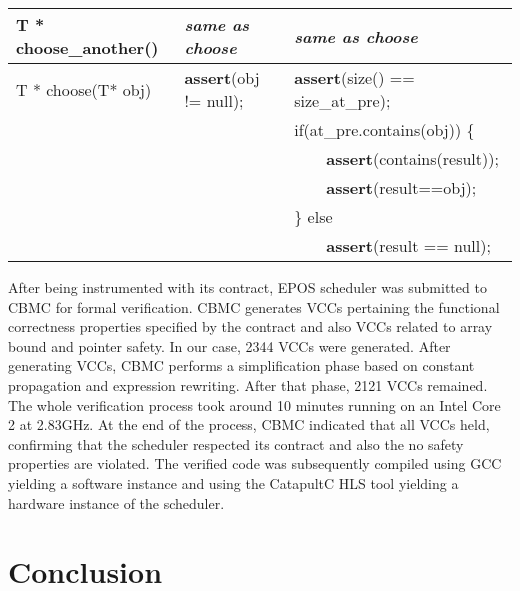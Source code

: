 \documentclass{sig-alternate}
\begin{document}
\begin{table*}[htb]
\begin{center}
{\begin{tabular}{|p{}|p{}|p{}|}
T * choose\_another()			& \textit{same as choose}			& \textit{same as choose} \\
\hline
T * choose(T* obj)			& \textbf{assert}(obj != null);		& \textbf{assert}(size() == size\_at\_pre);	\\
					&					& if(at\_pre.contains(obj)) \{			\\
					&					& ~~~~\textbf{assert}(contains(result));		\\
					&					& ~~~~\textbf{assert}(result==obj);		\\
					&					& \} else					\\
					&					& ~~~~\textbf{assert}(result == null);		\\
\hline
\end{tabular}
}\label{tab:scheduler1s_contract}
\end{center}
\end{table*}

After being instrumented with its contract, EPOS scheduler was submitted
to CBMC for formal verification.  CBMC generates VCCs pertaining the
functional correctness properties specified by the contract and also
VCCs related to array bound and pointer safety.  In our case, 2344 VCCs
were generated.  After generating VCCs, CBMC performs a simplification
phase based on constant propagation and expression rewriting.  After
that phase, 2121 VCCs remained.  The whole verification process took
around 10 minutes running on an Intel Core 2 at 2.83GHz.  At the end of
the process, CBMC indicated that all VCCs held, confirming that the
scheduler respected its contract and also the no safety properties are
violated. The verified code was subsequently compiled using GCC yielding
a software instance and using the CatapultC HLS tool
\cite{Calypto:Catapult} yielding a hardware instance of the scheduler.


\section{Conclusion} \label{concl}
\end{document}
